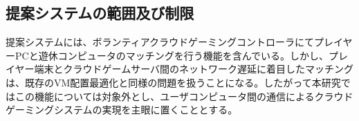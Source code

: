 \subsection{提案システムの範囲及び制限}
提案システムには、ボランティアクラウドゲーミングコントローラにてプレイヤーPCと遊休コンピュータのマッチングを行う機能を含んでいる。しかし、プレイヤー端末とクラウドゲームサーバ間のネットワーク遅延に着目したマッチングは、既存のVM配置最適化\cite{placing}と同様の問題を扱うことになる。したがって本研究ではこの機能については対象外とし、ユーザコンピュータ間の通信によるクラウドゲーミングシステムの実現を主眼に置くこととする。